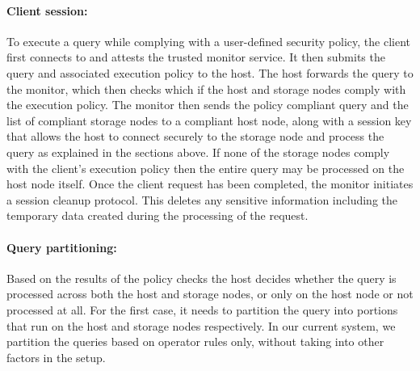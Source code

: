 \paragraph{Client session:} To execute a query while complying with a user-defined security policy, the client first connects to and attests the trusted monitor service. It then submits the query and associated execution policy to the host. The host forwards the query to the monitor, which then checks which if the host and storage nodes comply with the execution policy. The monitor then sends the policy compliant query and the list of compliant storage nodes to a compliant host node, along with a session key that allows the host to connect securely to the storage node and process the query as explained in the sections above. If none of the storage nodes comply with the client's execution policy then the entire query may be processed on the host node itself. Once the client request has been completed, the monitor initiates a session cleanup protocol. This deletes any sensitive information including the temporary data created during the processing of the request.

\paragraph{Query partitioning:} Based on the results of the policy checks the host decides whether the query is processed across both the host and storage nodes, or only on the host node or not processed at all. For the first case, it needs to partition the query into portions that run on the host and storage nodes respectively. In our current system, we partition the queries based on operator rules only, without taking into other factors in the setup.

